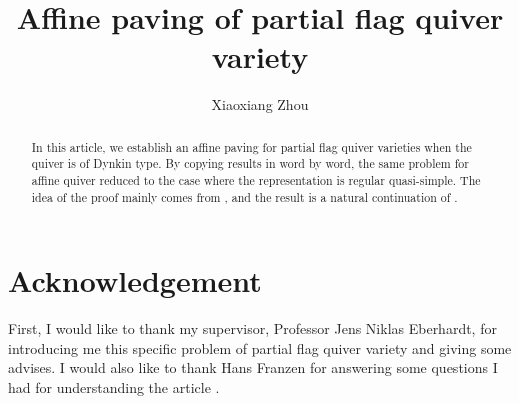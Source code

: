 \documentclass[reqno,11pt]{amsart}
\numberwithin{equation}{section}
\theoremstyle{plain}
\theoremstyle{plain}
\numberwithin{equation}{section}
\theoremstyle{remark}
\begin{document}
\date{}

\title
{Affine paving of partial flag quiver variety}


\author{Xiaoxiang Zhou}
\address{School of Mathematical Sciences\\
University of Bonn\\
Bonn, 53115\\ Germany\\} 





\begin{abstract}
In this article, we establish an affine paving for partial flag quiver varieties when the quiver is of Dynkin type. By copying results in \cite[section 6]{irelli2019cell} word by word, the same problem for affine quiver reduced to the case where the representation is regular quasi-simple. The idea of the proof mainly comes from \cite{irelli2019cell}, and the result is a natural continuation of \cite{maksimau2019flag}.
\end{abstract}



\maketitle
\tableofcontents
\section*{Acknowledgement}
First, I would like to thank my supervisor, Professor Jens Niklas Eberhardt, for introducing me this specific problem of partial flag quiver variety and giving some advises. I would also like to thank Hans Franzen for answering some questions I had for understanding the article \cite{irelli2019cell}.
\end{document}

